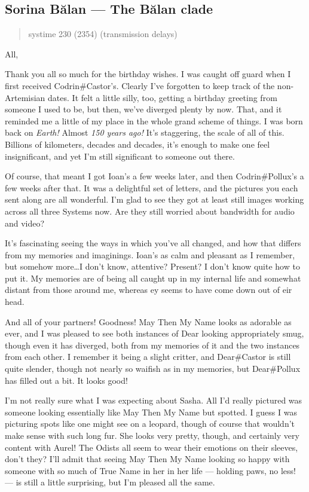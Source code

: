 \hypertarget{sorina-bux103lan-the-bux103lan-clade}{%
\subsection{Sorina Bălan — The Bălan clade}\label{sorina-bux103lan-the-bux103lan-clade}}

\begin{quote}
systime 230 (2354) (transmission delays)
\end{quote}

All,

Thank you all so much for the birthday wishes. I was caught off guard when I first received Codrin\#Castor's. Clearly I've forgotten to keep track of the non-Artemisian dates. It felt a little silly, too, getting a birthday greeting from someone I used to be, but then, we've diverged plenty by now. That, and it reminded me a little of my place in the whole grand scheme of things. I was born back on \emph{Earth!} Almost \emph{150 years ago!} It's staggering, the scale of all of this. Billions of kilometers, decades and decades, it's enough to make one feel insignificant, and yet I'm still significant to someone out there.

Of course, that meant I got Ioan's a few weeks later, and then Codrin\#Pollux's a few weeks after that. It was a delightful set of letters, and the pictures you each sent along are all wonderful. I'm glad to see they got at least still images working across all three Systems now. Are they still worried about bandwidth for audio and video?

It's fascinating seeing the ways in which you've all changed, and how that differs from my memories and imaginings. Ioan's as calm and pleasant as I remember, but somehow more\ldots{}I don't know, attentive? Present? I don't know quite how to put it. My memories are of being all caught up in my internal life and somewhat distant from those around me, whereas ey seems to have come down out of eir head.

And all of your partners! Goodness! May Then My Name looks as adorable as ever, and I was pleased to see both instances of Dear looking appropriately smug, though even it has diverged, both from my memories of it and the two instances from each other. I remember it being a slight critter, and Dear\#Castor is still quite slender, though not nearly so waifish as in my memories, but Dear\#Pollux has filled out a bit. It looks good!

I'm not really sure what I was expecting about Sasha. All I'd really pictured was someone looking essentially like May Then My Name but spotted. I guess I was picturing spots like one might see on a leopard, though of course that wouldn't make sense with such long fur. She looks very pretty, though, and certainly very content with Aurel! The Odists all seem to wear their emotions on their sleeves, don't they? I'll admit that seeing May Then My Name looking so happy with someone with so much of True Name in her in her life — holding paws, no less! — is still a little surprising, but I'm pleased all the same.

